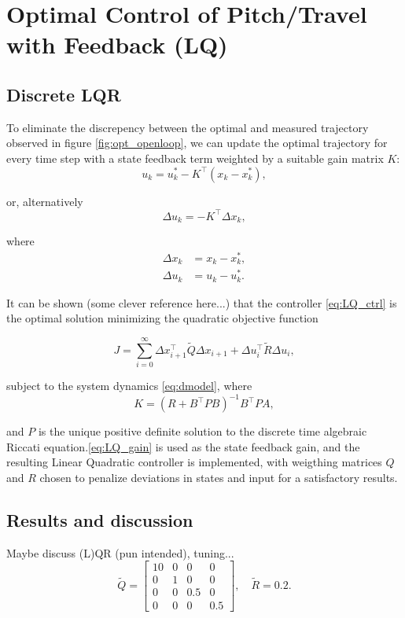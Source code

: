 \section{Optimal Control of Pitch/Travel with Feedback (LQ)}\label{sec:prob3}

\subsection{Discrete LQR}
\label{text:LQR}

To eliminate the discrepency between the optimal and measured trajectory observed in figure \ref{fig:opt_openloop}, we can update the optimal trajectory for every time step with a state feedback term weighted by a suitable gain matrix $K$:
\begin{equation*}
u_k = u_k^* - K^\top(x_k - x_k^*),
\end{equation*}

or, alternatively
\begin{equation}
\label{eq:LQ_ctrl}
\Delta u_k = - K^\top \Delta x_k,
\end{equation}

where 
\begin{align*}
\Delta x_k &= x_k - x_k^*,\\
\Delta u_k &= u_k - u_k^*.
\end{align*}

It can be shown (some clever reference here...) that the controller \eqref{eq:LQ_ctrl} is the optimal solution minimizing the quadratic objective function

\begin{equation*}
	J = \sum_{i=0}^{\infty} \Delta x_{i+1}^\top \tilde{Q} \Delta x_{i+1} + \Delta u_i^\top \tilde{R} \Delta u_i,
\end{equation*}

subject to the system dynamics \eqref{eq:dmodel}, where
\begin{equation}
\label{eq:LQ_gain}
	K = (R + B^\top P B)^{-1} B^\top P A,
\end{equation}

and $P$ is the unique positive definite solution to the discrete time algebraic Riccati equation.\eqref{eq:LQ_gain} is used as the state feedback gain, and the resulting Linear Quadratic controller is implemented, with weigthing matrices $Q$ and $R$ chosen to penalize deviations in states and input for a satisfactory results.

\subsection{Results and discussion}
Maybe discuss (L)QR (pun intended), tuning...
\begin{equation*}
\tilde{Q} = \begin{bmatrix}10&0&0&0\\0&1&0&0\\0&0&0.5&0\\0&0&0&0.5\end{bmatrix}, \quad \tilde{R} = 0.2.
\end{equation*}

